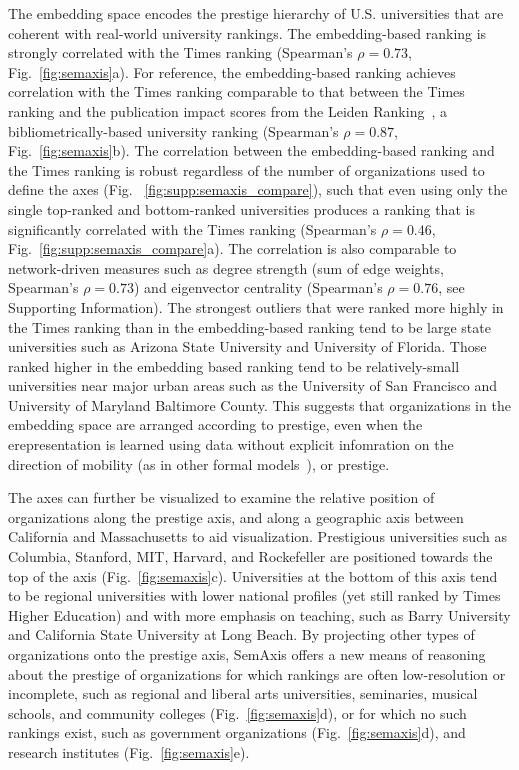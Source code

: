 \documentclass[12pt]{article} %
\def\SI{Supporting Information}
\begin{document}
The embedding space encodes the prestige hierarchy of U.S. universities that are coherent with real-world university rankings.
The embedding-based ranking is strongly correlated with the Times ranking (Spearman's $\rho = 0.73$, Fig.~\ref{fig:semaxis}a).
For reference, the embedding-based ranking achieves correlation with the Times ranking comparable to that between the Times ranking and the publication impact scores from the Leiden Ranking~\autocite{waltman2012leidenrankings}, a bibliometrically-based university ranking (Spearman's $\rho = 0.87$, Fig.~\ref{fig:semaxis}b).
The correlation between the embedding-based ranking and the Times ranking is robust regardless of the number of organizations used to define the axes (Fig. ~\ref{fig:supp:semaxis_compare}), such that even using only the single top-ranked and bottom-ranked universities produces a ranking that is significantly correlated with the Times ranking (Spearman's $\rho = 0.46$, Fig.~\ref{fig:supp:semaxis_compare}a).
The correlation is also comparable to network-driven measures such as degree strength (sum of edge weights, Spearman's $\rho = 0.73$) and eigenvector centrality (Spearman's $\rho = 0.76$, see \SI). 
The strongest outliers that were ranked more highly in the Times ranking than in the embedding-based ranking tend to be large state universities such as Arizona State University and  University of Florida.
Those ranked higher in the embedding based ranking tend to be relatively-small universities near major urban areas such as the University of San Francisco and University of Maryland Baltimore County.
This suggests that organizations in the embedding space are arranged according to prestige, even when the erepresentation is learned using data without explicit infomration on the direction of mobility (as in other formal models~\autocite{clauset2015hierarchy}), or prestige. 


The axes can further be visualized to examine the relative position of organizations along the prestige axis, and along a geographic axis between California and Massachusetts to aid visualization.
Prestigious universities such as Columbia, Stanford, MIT, Harvard, and Rockefeller are positioned towards the top of the axis (Fig.~\ref{fig:semaxis}c).
Universities at the bottom of this axis tend to be regional universities with lower national profiles (yet still ranked by Times Higher Education) and with more emphasis on teaching, such as Barry University and California State University at Long Beach.
By projecting other types of organizations onto the prestige axis, SemAxis offers a new means of reasoning about the prestige of organizations for which rankings are often low-resolution or incomplete, such as regional and liberal arts universities, seminaries, musical schools, and community colleges (Fig.~\ref{fig:semaxis}d), or for which no such rankings exist, such as government organizations (Fig.~\ref{fig:semaxis}d), and research institutes (Fig.~\ref{fig:semaxis}e).
\end{document}
